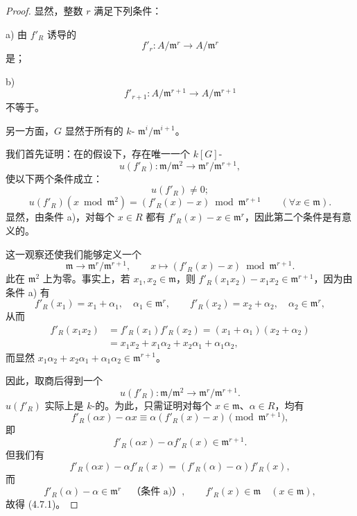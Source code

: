 \begin{proof}
显然，整数 $r$ 满足下列条件：

\textup{a)} 由 $f'_R$ 诱导的
\[
f'_r:A/\mathfrak m^r\longrightarrow A/\mathfrak m^r
\]
是；

\textup{b)} 
\[
f'_{r+1}:A/\mathfrak m^{r+1}\longrightarrow A/\mathfrak m^{r+1}
\]
不等于。

另一方面，$G$ 显然于所有的 $k$- $\mathfrak m^i/\mathfrak m^{i+1}$。

我们首先证明：在的假设下，存在唯一一个 $k[G]$-
\[
u(f'_R):\mathfrak m/\mathfrak m^2\longrightarrow
 \mathfrak m^r/\mathfrak m^{r+1},
\]
使以下两个条件成立：
\[
u(f'_R)\ne0;
\]
\[
u(f'_R)(x\bmod\mathfrak m^2)
=(f'_R(x)-x)\bmod\mathfrak m^{r+1}\qquad(\forall x\in\mathfrak m).
\]
显然，由条件 a)，对每个 $x\in R$ 都有 $f'_R(x)-x\in\mathfrak m^r$，因此第二个条件是有意义的。

这一观察还使我们能够定义一个
\[
\mathfrak m\longrightarrow\mathfrak m^r/\mathfrak m^{r+1},
\qquad x\longmapsto(f'_R(x)-x)\bmod\mathfrak m^{r+1}.
\]
此在 $\mathfrak m^2$ 上为零。事实上，若 $x_1,x_2\in\mathfrak m$，则
$f'_R(x_1x_2)-x_1x_2\in\mathfrak m^{r+1}$，因为由条件 a) 有
\[
f'_R(x_1)=x_1+\alpha_1,\quad\alpha_1\in\mathfrak m^r,
\qquad
f'_R(x_2)=x_2+\alpha_2,\quad\alpha_2\in\mathfrak m^r,
\]
从而
\[
\begin{aligned}
f'_R(x_1x_2)&=f'_R(x_1)f'_R(x_2)=(x_1+\alpha_1)(x_2+\alpha_2)\\
&=x_1x_2+x_1\alpha_2+x_2\alpha_1+\alpha_1\alpha_2,
\end{aligned}
\]
而显然 $x_1\alpha_2+x_2\alpha_1+\alpha_1\alpha_2\in\mathfrak m^{r+1}$。

因此，取商后得到一个
\[
u(f'_R):\mathfrak m/\mathfrak m^2\longrightarrow
 \mathfrak m^r/\mathfrak m^{r+1}.
\]
 $u(f'_R)$ 实际上是 $k$-的。为此，只需证明对每个 $x\in\mathfrak m$、$\alpha\in R$，均有
\[
f'_R(\alpha x)-\alpha x
\equiv\alpha(f'_R(x)-x)\pmod{\mathfrak m^{r+1}},
\]
即
\[
f'_R(\alpha x)-\alpha f'_R(x)\in\mathfrak m^{r+1}.
\tag{4.7.1}
\]
但我们有
\[
f'_R(\alpha x)-\alpha f'_R(x)=(f'_R(\alpha)-\alpha)f'_R(x),
\]
而
\[
f'_R(\alpha)-\alpha\in\mathfrak m^r\quad\text{（条件 a)）},\qquad
f'_R(x)\in\mathfrak m\quad(x\in\mathfrak m),
\]
故得 (4.7.1)。


\end{proof}

